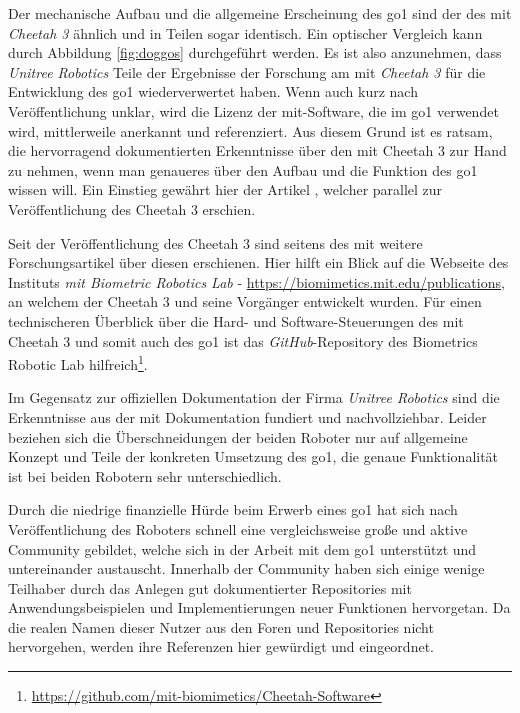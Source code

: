Der mechanische Aufbau und die allgemeine Erscheinung des \gls{go1} sind der des \gls{mit} \emph{Cheetah \num{3}} ähnlich
und in Teilen sogar identisch.
Ein optischer Vergleich kann durch Abbildung \ref{fig:doggos} durchgeführt werden.
Es ist also anzunehmen, dass \emph{Unitree Robotics} Teile der Ergebnisse der Forschung am \gls{mit} \emph{Cheetah \num{3}}
für die Entwicklung des \gls{go1} wiederverwertet haben.
Wenn auch kurz nach Veröffentlichung unklar, wird die Lizenz der \gls{mit}-Software, die im \gls{go1} verwendet wird,
mittlerweile anerkannt und referenziert.
Aus diesem Grund ist es ratsam, die hervorragend dokumentierten Erkenntnisse über den \gls{mit} Cheetah \num{3} zur Hand zu
nehmen, wenn man genaueres über den Aufbau und die Funktion des \gls{go1} wissen will.
Ein Einstieg gewährt hier der Artikel , welcher parallel zur Veröffentlichung des Cheetah \num{3}
erschien.

Seit der Veröffentlichung des Cheetah \num{3} sind seitens des \gls{mit} weitere Forschungsartikel über diesen erschienen.
Hier hilft ein Blick auf die Webseite des Instituts \emph{\gls{mit} Biometric Robotics Lab} - \url{https://biomimetics.mit.edu/publications},
an welchem der Cheetah \num{3} und seine Vorgänger entwickelt wurden.
Für einen technischeren Überblick über die Hard- und Software-Steuerungen des \gls{mit} Cheetah 3 und somit auch des \gls{go1}
ist das \emph{GitHub}-Repository des Biometrics Robotic Lab hilfreich\footnote{\url{https://github.com/mit-biomimetics/Cheetah-Software}}.

Im Gegensatz zur offiziellen Dokumentation der Firma \emph{Unitree Robotics} sind die Erkenntnisse aus der \gls{mit}
Dokumentation fundiert und nachvollziehbar.
Leider beziehen sich die Überschneidungen der beiden Roboter nur auf allgemeine Konzept und Teile der konkreten Umsetzung des
\gls{go1}, die genaue Funktionalität ist bei beiden Robotern sehr unterschiedlich.


\noindent Durch die niedrige finanzielle Hürde beim Erwerb eines \gls{go1} hat sich nach Veröffentlichung des Roboters schnell eine
vergleichsweise große und aktive Community gebildet, welche sich in der Arbeit mit dem \gls{go1} unterstützt und untereinander
austauscht.
Innerhalb der Community haben sich einige wenige Teilhaber durch das Anlegen gut dokumentierter Repositories mit Anwendungsbeispielen
und Implementierungen neuer Funktionen hervorgetan.
Da die realen Namen dieser Nutzer aus den Foren und Repositories nicht hervorgehen, werden ihre Referenzen hier gewürdigt
und eingeordnet.

